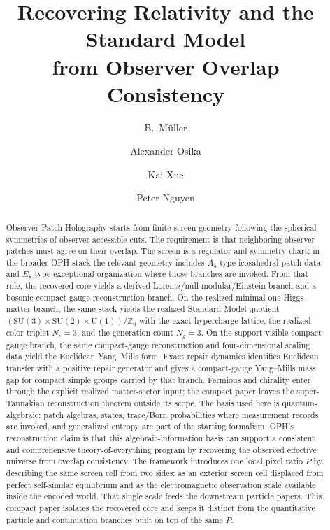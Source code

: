 \documentclass[11pt]{article}
\title{Recovering Relativity and the Standard Model\\
from Observer Overlap Consistency}
\author{B.\ M\"uller \and Alexander Osika \and Kai Xue \and Peter Nguyen}
\date{\OPHPaperReleaseDate}
\newcommand{\SU}{\mathrm{SU}}
\newcommand{\U}{\mathrm{U}}
\begin{document}
\maketitle
\OPHPaperReleaseBanner

\begin{abstract}
Observer-Patch Holography starts from finite screen geometry following the spherical symmetries of observer-accessible cuts. The requirement is that neighboring observer patches must agree on their overlap. The screen is a regulator and symmetry chart; in the broader OPH stack the relevant geometry includes \(A_5\)-type icosahedral patch data and \(E_8\)-type exceptional organization where those branches are invoked. From that rule, the recovered core yields a derived Lorentz/null-modular/Einstein branch and a bosonic compact-gauge reconstruction branch. On the realized minimal one-Higgs matter branch, the same stack yields the realized Standard Model quotient \(\left(\SU(3)\times\SU(2)\times\U(1)\right)/\mathbb Z_6\) with the exact hypercharge lattice, the realized color triplet \(N_c=3\), and the generation count \(N_g=3\). On the support-visible compact-gauge branch, the same compact-gauge reconstruction and four-dimensional scaling data yield the Euclidean Yang--Mills form. Exact repair dynamics identifies Euclidean transfer with a positive repair generator and gives a compact-gauge Yang--Mills mass gap for compact simple groups carried by that branch. Fermions and chirality enter through the explicit realized matter-sector input; the compact paper leaves the super-Tannakian reconstruction theorem outside its scope. The basis used here is quantum-algebraic: patch algebras, states, trace/Born probabilities where measurement records are invoked, and generalized entropy are part of the starting formalism. OPH's reconstruction claim is that this algebraic-information basis can support a consistent and comprehensive theory-of-everything program by recovering the observed effective universe from overlap consistency. The framework introduces one local pixel ratio \(P\) by describing the same screen cell from two sides: as an exterior screen cell displaced from perfect self-similar equilibrium and as the electromagnetic observation scale available inside the encoded world. That single scale feeds the downstream particle papers. This compact paper isolates the recovered core and keeps it distinct from the quantitative particle and continuation branches built on top of the same \(P\).
\end{abstract}
\end{document}
